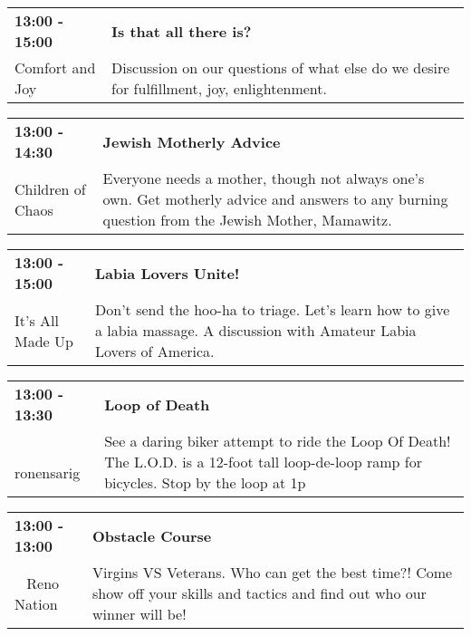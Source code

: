 \begin{tabular}{ p{1in} p{2.2in} }
    \textbf{13:00 - 15:00} & \textbf{Is that all there is?} \\
    Comfort and Joy \newline  & Discussion on our questions of  what else do we desire for fulfillment, joy, enlightenment. \\
    \hline 
\end{tabular}
    
\begin{tabular}{ p{1in} p{2.2in} }
    \textbf{13:00 - 14:30} & \textbf{Jewish Motherly Advice} \\
    Children of Chaos \newline  & Everyone needs a mother, though not always one's own.  Get motherly advice and answers to any burning question from the Jewish Mother, Mamawitz. \\
    \hline 
\end{tabular}
    
\begin{tabular}{ p{1in} p{2.2in} }
    \textbf{13:00 - 15:00} & \textbf{Labia Lovers Unite!} \\
    It's All Made Up \newline  & Don't send the hoo-ha to triage. Let's learn how to give a labia massage. A discussion with Amateur Labia Lovers of America. \\
    \hline 
\end{tabular}
    
\begin{tabular}{ p{1in} p{2.2in} }
    \textbf{13:00 - 13:30} & \textbf{Loop of Death} \\
    ~ \newline ronensarig & See a daring biker attempt to ride the Loop Of Death! The L.O.D. is a 12-foot tall loop-de-loop ramp for bicycles. Stop by the loop at 1p \\
    \hline 
\end{tabular}
    
\begin{tabular}{ p{1in} p{2.2in} }
    \textbf{13:00 - 13:00} & \textbf{Obstacle Course} \\
    ~ \newline Reno Nation & Virgins VS Veterans. Who can get the best time?! Come show off your skills and tactics and find out who our winner will be! \\
    \hline 
\end{tabular}
    
